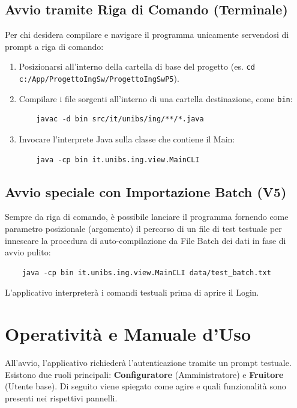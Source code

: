 \subsection{Avvio tramite Riga di Comando (Terminale)}
Per chi desidera compilare e navigare il programma unicamente servendosi di prompt a riga di comando:
\begin{enumerate}
    \item Posizionarsi all'interno della cartella di base del progetto (es. \texttt{cd c:/App/ProgettoIngSw/ProgettoIngSwP5}).
    \item Compilare i file sorgenti all'interno di una cartella destinazione, come \texttt{bin}:
    \begin{verbatim}
    javac -d bin src/it/unibs/ing/**/*.java
    \end{verbatim}
    \item Invocare l'interprete Java sulla classe che contiene il Main:
    \begin{verbatim}
    java -cp bin it.unibs.ing.view.MainCLI
    \end{verbatim}
\end{enumerate}

\subsection{Avvio speciale con Importazione Batch (V5)}
Sempre da riga di comando, è possibile lanciare il programma fornendo come parametro posizionale (argomento) il percorso di un file di test testuale per innescare la procedura di auto-compilazione da File Batch dei dati in fase di avvio pulito:
\begin{verbatim}
    java -cp bin it.unibs.ing.view.MainCLI data/test_batch.txt
\end{verbatim}
L'applicativo interpreterà i comandi testuali prima di aprire il Login.

\section{Operatività e Manuale d'Uso}

All'avvio, l'applicativo richiederà l'autenticazione tramite un prompt testuale. Esistono due ruoli principali: \textbf{Configuratore} (Amministratore) e \textbf{Fruitore} (Utente base). Di seguito viene spiegato come agire e quali funzionalità sono presenti nei rispettivi pannelli.


